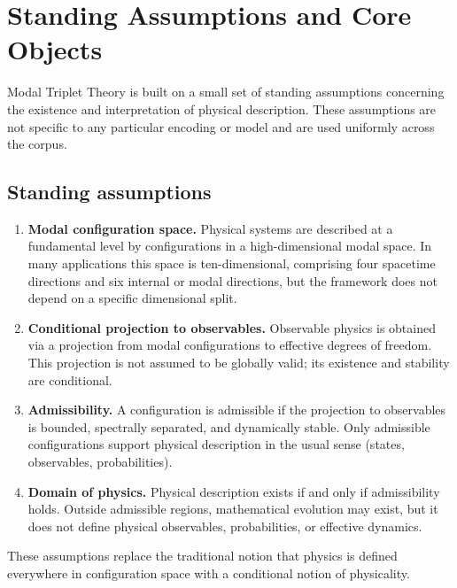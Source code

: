 \documentclass[11pt]{article}
\begin{document}
\section{Standing Assumptions and Core Objects}

Modal Triplet Theory is built on a small set of standing assumptions concerning the existence and interpretation of physical description. These assumptions are not specific to any particular encoding or model and are used uniformly across the corpus.

\subsection{Standing assumptions}

\begin{enumerate}[label=\textbf{SA.\arabic*}]
\item \textbf{Modal configuration space.}  
Physical systems are described at a fundamental level by configurations in a high-dimensional modal space. In many applications this space is ten-dimensional, comprising four spacetime directions and six internal or modal directions, but the framework does not depend on a specific dimensional split.

\item \textbf{Conditional projection to observables.}  
Observable physics is obtained via a projection from modal configurations to effective degrees of freedom. This projection is not assumed to be globally valid; its existence and stability are conditional.

\item \textbf{Admissibility.}  
A configuration is admissible if the projection to observables is bounded, spectrally separated, and dynamically stable. Only admissible configurations support physical description in the usual sense (states, observables, probabilities).

\item \textbf{Domain of physics.}  
Physical description exists if and only if admissibility holds. Outside admissible regions, mathematical evolution may exist, but it does not define physical observables, probabilities, or effective dynamics.
\end{enumerate}

These assumptions replace the traditional notion that physics is defined everywhere in configuration space with a conditional notion of physicality.
\end{document}

